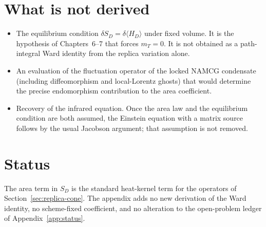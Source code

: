 \section{What is not derived}
\label{sec:not-derived}

\begin{itemize}
  \item The equilibrium condition
        \(\delta S_D=\delta\langle H_D\rangle\) under fixed volume.
        It is the hypothesis of Chapters~6--7 that forces \(m_T=0\).
        It is not obtained as a path-integral Ward identity from the
        replica variation alone.
  \item An evaluation of the fluctuation operator of the locked
        NAMCG condensate (including diffeomorphism and local-Lorentz
        ghosts) that would determine the precise endomorphism
        contribution to the area coefficient.
  \item Recovery of the infrared equation. Once the area law and the
        equilibrium condition are both assumed, the Einstein equation
        with a matrix source follows by the usual Jacobson argument;
        that assumption is not removed.
\end{itemize}

\section{Status}
\label{sec:appG-status}

The area term in \(S_D\) is the standard heat-kernel term for the operators of
Section~\ref{sec:replica-cone}. The
appendix adds no new derivation of the Ward identity, no scheme-fixed
coefficient, and no alteration to the open-problem ledger of
Appendix~\ref{app:status}.